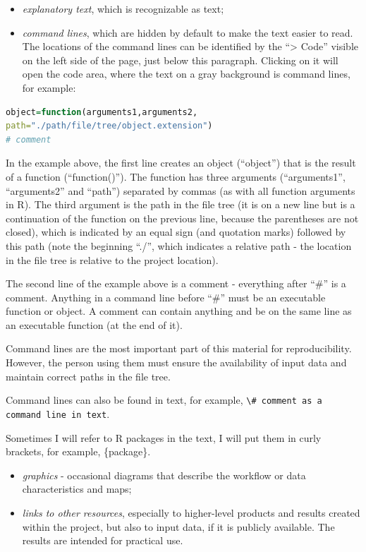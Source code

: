\documentclass[
]{book}
\newcommand{\passthrough}[1]{#1}
\begin{document}
\begin{itemize}
\item
  \emph{explanatory text}, which is recognizable as text;
\item
  \emph{command lines}, which are hidden by default to make the text easier to read.
  The locations of the command lines can be identified by the ``\textbar\textgreater{} Code'' visible
  on the left side of the page, just below this paragraph. Clicking on it will open
  the code area, where the text on a gray background is command lines, for example:
\end{itemize}

\begin{lstlisting}[language=R]
object=function(arguments1,arguments2,
path="./path/file/tree/object.extension")
# comment
\end{lstlisting}

In the example above, the first line creates an object (``object'') that is
the result of a function (``function()''). The function has three
arguments (``arguments1'', ``arguments2'' and ``path'') separated by commas (as with all
function arguments in R). The third argument is the path in the file tree (it is
on a new line but is a continuation of the function on the previous line, because
the parentheses are not closed), which is indicated by an equal sign (and quotation
marks) followed by this path (note the beginning ``./'', which indicates a relative
path - the location in the file tree is relative to the project location).

The second line of the example above is a comment - everything after ``\#'' is a
comment. Anything in a command line before ``\#'' must be an executable function or
object. A comment can contain anything and be on the same line as an executable
function (at the end of it).

Command lines are the most important part of this material for reproducibility.
However, the person using them must ensure the availability of input data and
maintain correct paths in the file tree.

Command lines can also be found in text, for example, \passthrough{\lstinline!\# comment as a command line in text!}.

Sometimes I will refer to R packages in the text, I will put them in curly
brackets, for example, \{package\}.

\begin{itemize}
\item
  \emph{graphics} - occasional diagrams that describe the workflow or data
  characteristics and maps;
\item
  \emph{links to other resources}, especially to higher-level products and results
  created within the project, but also to input data, if it is publicly
  available. The results are intended for practical use.
\end{itemize}
\end{document}
